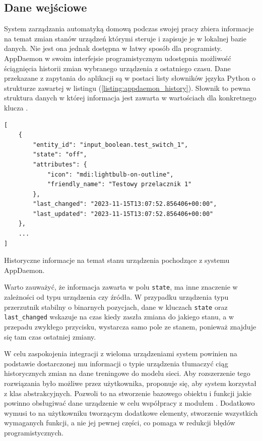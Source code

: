 \subsection{Dane wejściowe}
System zarządzania automatyką domową podczas swojej pracy zbiera informacje na temat zmian stanów urządzeń którymi steruje i zapisuje je w lokalnej bazie danych. Nie jest ona jednak dostępna w łatwy sposób dla programisty. AppDaemon w swoim interfejsie programistycznym udostępnia możliwość ściągnięcia historii zmian wybranego urządzenia z ostatniego czasu. Dane przekazane z zapytania do aplikacji są w postaci listy słowników języka Python o strukturze zawartej w listingu (\ref{listing:appdaemon_history}). Słownik to pewna struktura danych w której informacja jest zawarta w wartościach dla konkretnego klucza \cite{book:learning_python}.

\begin{listing}
\begin{verbatim}
[
    {
        "entity_id": "input_boolean.test_switch_1",
        "state": "off",
        "attributes": {
            "icon": "mdi:lightbulb-on-outline",
            "friendly_name": "Testowy przelacznik 1"
        },
        "last_changed": "2023-11-15T13:07:52.856406+00:00",
        "last_updated": "2023-11-15T13:07:52.856406+00:00"
    },
    ...
]
\end{verbatim}
\caption{Historyczne informacje na temat stanu urządzenia pochodzące z systemu AppDaemon.} \label{listing:appdaemon_history}
\end{listing}

Warto zauważyć, że informacja zawarta w polu \verb+state+, ma inne znaczenie w zależności od typu urządzenia czy źródła. W przypadku urządzenia typu przerzutnik stabilny o binarnych pozycjach, dane w kluczach \verb+state+ oraz \verb+last_changed+ wskazuje na czas kiedy zaszła zmiana do jakiego stanu, a w przepadu zwykłego przycisku, wystarcza samo pole ze stanem, ponieważ znajduje się tam czas ostatniej zmiany.

W celu zaspokojenia integracji z wieloma urządzeniami system powinien na podstawie dostarczonej mu informacji o typie urządzenia tłumaczyć ciąg historycznych zmian na dane treningowe do modelu sieci. Aby rozszerzenie tego rozwiązania było możliwe przez użytkownika, proponuje się, aby system korzystał z klas abstrakcyjnych. Pozwoli to na stworzenie bazowego obiektu i funkcji jakie powinno obsługiwać dane urządzenie w celu współpracy z modułem \cite{book:czysty_kod}. Dodatkowo wymusi to na użytkowniku tworzącym dodatkowe elementy, stworzenie wszystkich wymaganych funkcji, a nie jej pewnej części, co pomaga w redukcji błędów programistycznych.

